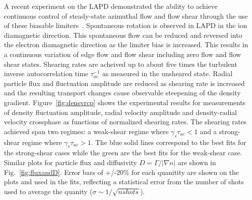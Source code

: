 \documentclass[aip,pop,amsmath,amssymb,preprint,superscriptaddress]{revtex4-1} %
\begin{document}
A recent experiment on the LAPD demonstrated the ability to achieve continuous control of steady-state azimuthal flow and flow shear through the use of these biasable limiters~\cite{schaffner12}. Spontaneous rotation is observed in LAPD in the ion diamagnetic direction.  This spontaneous flow can be reduced and reversed into the  electron diamagnetic direction as the limiter bias is increased. This results in a continuous variation of edge flow and flow shear including zero flow and flow shear states. Shearing rates are acheived up to about five times the turbulent inverse autocorrelation time  $\tau_{ac}^{-1}$ as measured in the unsheared state. Radial particle flux and fluctuation amplitude are reduced as shearing rate is increased and the resulting transport changes cause observable steepening of the density gradient. Figure~\ref{fig:densvrcp} shows the experimental results for measurements of density fluctuation amplitude, radial velocity amplitude and density-radial velocity crossphase as functions of normalized shearing rates. The shearing rates achieved span two regimes: a weak-shear regime where $\gamma_{s}\tau_{ac} < 1$ and a strong-shear regime where $\gamma_{s}\tau_{ac} > 1$. The blue solid lines correspond to the best fits for the strong-shear cases while the green are the best fits for the weak-shear case.  Similar plots for particle flux and diffusivity $D = \Gamma/|\nabla n|$ are shown in Fig.~\ref{fig:fluxandD}.  Error bars of +/-20\% for each quanitity are shown on the plots and used in the fits, reflecting a statistical error from the number of shots used to average the quanity ($\sigma \sim 1/\sqrt{nshots}$).
\end{document}
